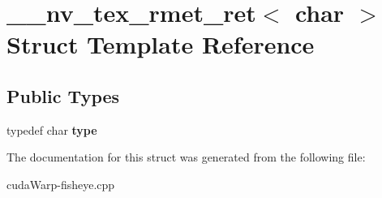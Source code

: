 \hypertarget{struct____nv__tex__rmet__ret_3_01char_01_4}{}\section{\+\_\+\+\_\+nv\+\_\+tex\+\_\+rmet\+\_\+ret$<$ char $>$ Struct Template Reference}
\label{struct____nv__tex__rmet__ret_3_01char_01_4}
\subsection*{Public Types}
\begin{DoxyCompactItemize}
\item 
typedef char {\bfseries type}\hypertarget{struct____nv__tex__rmet__ret_3_01char_01_4_a09f141620067182fb90dbbefef357030}{}\label{struct____nv__tex__rmet__ret_3_01char_01_4_a09f141620067182fb90dbbefef357030}

\end{DoxyCompactItemize}


The documentation for this struct was generated from the following file\+:\begin{DoxyCompactItemize}
\item 
cuda\+Warp-\/fisheye.\+cpp\end{DoxyCompactItemize}
